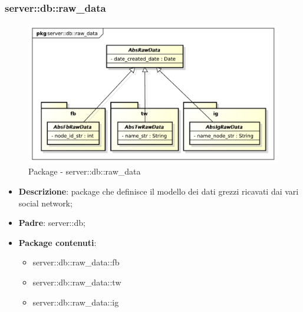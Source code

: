 \subsubsection{server::db::raw\_data} %
\label{ssub:bdsm_app_server_raw_data}
	\begin{figure}[htbp]
		\centering
		\centerline{\includegraphics[scale=0.4]{./images/server/raw_data.pdf}}
		\caption{Package - server::db::raw\_data}
	\end{figure}
	\begin{itemize}
	\item \textbf{Descrizione}: package che definisce il modello dei dati grezzi ricavati dai vari social network;
		\item \textbf{Padre}: server::db;
		\item \textbf{Package contenuti}:
			\begin{itemize}
				\item server::db::raw\_data::fb
				\item server::db::raw\_data::tw
				\item server::db::raw\_data::ig
		\end{itemize}
	\end{itemize}

